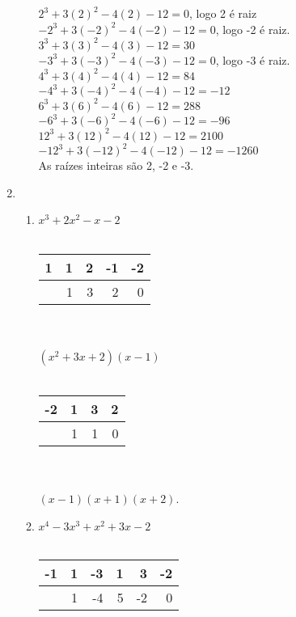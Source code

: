 \begin{enumerate}
\begin{enumerate}
			$2^3+3(2)^2-4(2)-12=0$, logo 2 é raiz\\
			$-2^3+3(-2)^2-4(-2)-12=0$, logo -2 é raiz.\\
			$3^3+3(3)^2-4(3)-12=30$\\
			$-3^3+3(-3)^2-4(-3)-12=0$, logo -3 é raiz.\\
			$4^3+3(4)^2-4(4)-12=84$\\
			$-4^3+3(-4)^2-4(-4)-12=-12$\\
			$6^3+3(6)^2-4(6)-12=288$\\
			$-6^3+3(-6)^2-4(-6)-12=-96$\\
			$12^3+3(12)^2-4(12)-12=2100$\\
			$-12^3+3(-12)^2-4(-12)-12=-1260$\\
			As raízes inteiras são 2, -2 e -3.
		\end{enumerate}
	\setcounter{enumi}{18}
	\item %
	\begin{enumerate}
		\item %
			$x^3 + 2x^2 - x - 2$
			\\
	 		\\
			\begin{tabular}{ l | r r r r }
			  1 & 1 & 2 & -1 & -2 \\
				\hline
			    & 1 & 3 & 2 & 0 \\
			\end{tabular}
			\\
			\\
			$(x^2 + 3x + 2)(x - 1)$
			\\
			\\
			\begin{tabular}{ l | r r r }
			  -2 & 1 & 3 & 2 \\
			  \hline
			    & 1 & 1 & 0  \\
			\end{tabular}
			\\
			\\
		   $(x - 1)(x + 1)(x + 2)$.
		   \\
		\item %
			$x^4 - 3x^3 + x^2 + 3x - 2$
			\\
			\\
			\begin{tabular}{ l | r r r r r }
			   -1 & 1 & -3 & 1 & 3 & -2  \\
				\hline
			    & 1 & -4 & 5 & -2 & 0 \\
			\end{tabular}

\end{enumerate}
\end{enumerate}
